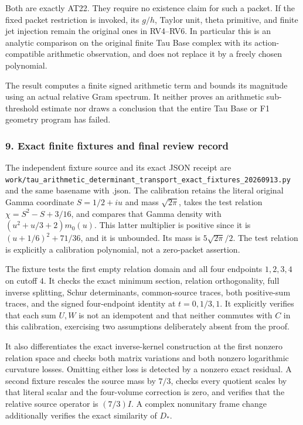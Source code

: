 \documentclass{article}
\begin{document}
Both are exactly AT22. They require no existence claim for such a packet. If the fixed packet restriction is invoked, its \(g/h\), Taylor unit, theta primitive, and finite jet injection remain the original ones in RV4--RV6. In particular this is an analytic comparison on the original finite Tau Base complex with its action-compatible arithmetic observation, and does not replace it by a freely chosen polynomial.

The result computes a finite signed arithmetic term and bounds its magnitude using an actual relative Gram spectrum. It neither proves an arithmetic sub-threshold estimate nor draws a conclusion that the entire Tau Base or F1 geometry program has failed.

\subsubsection{9. Exact finite fixtures and final review record}\label{endpoint-determinant_review--exact-finite-fixtures-and-final-review-record}

The independent fixture source and its exact JSON receipt are \nolinkurl{work/tau_arithmetic_determinant_transport_exact_fixtures_20260913.py} and the same basename with .json. The calibration retains the literal original Gamma coordinate \(S=1/2+iu\) and mass \(\sqrt{2\pi}\), takes the test relation \(\chi=S^2-S+3/16\), and compares that Gamma density with \((u^2+u/3+2)m_0(u)\). This latter multiplier is positive since it is \((u+1/6)^2+71/36\), and it is unbounded. Its mass is \(5\sqrt{2\pi}/2\). The test relation is explicitly a calibration polynomial, not a zero-packet assertion.

The fixture tests the first empty relation domain and all four endpoints \(1,2,3,4\) on cutoff \(4\). It checks the exact minimum section, relation orthogonality, full inverse splitting, Schur determinants, common-source traces, both positive-sum traces, and the signed four-endpoint identity at \(t=0,1/3,1\). It explicitly verifies that each sum \(U,W\) is not an idempotent and that neither commutes with \(C\) in this calibration, exercising two assumptions deliberately absent from the proof.

It also differentiates the exact inverse-kernel construction at the first nonzero relation space and checks both matrix variations and both nonzero logarithmic curvature losses. Omitting either loss is detected by a nonzero exact residual. A second fixture rescales the source mass by \(7/3\), checks every quotient scales by that literal scalar and the four-volume correction is zero, and verifies that the relative source operator is \((7/3)I\). A complex nonunitary frame change additionally verifies the exact similarity of \(D_*\).
\end{document}
